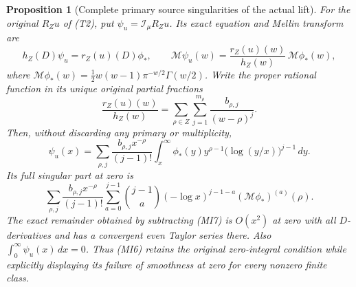 \documentclass[11pt]{article}
\newtheorem{proposition}[theorem]{Proposition}
\begin{document}
\begin{proposition}[Complete primary source singularities of the actual lift]
For the original $R_Zu$ of (T2), put
$\psi_u=\mathcal I_\mu R_Zu$. Its exact equation and Mellin transform
are
\[
 h_Z(D)\psi_u=r_Z(u)(D)\phi_*,\qquad
 \mathcal M\psi_u(w)=
       \frac{r_Z(u)(w)}{h_Z(w)}\,\mathcal M\phi_*(w),
 \tag{MI5}
\]
where
$\mathcal M\phi_*(w)=\frac12w(w-1)\pi^{-w/2}\Gamma(w/2)$.
Write the proper rational function in its unique original partial
fractions
\[
 \frac{r_Z(u)(w)}{h_Z(w)}
 =\sum_{\rho\in Z}\sum_{j=1}^{m_\rho}
                     \frac{b_{\rho,j}}{(w-\rho)^j}.
\]
Then, without discarding any primary or multiplicity,
\[
 \psi_u(x)=\sum_{\rho,j}\frac{b_{\rho,j}x^{-\rho}}{(j-1)!}
  \int_x^\infty \phi_*(y)y^{\rho-1}
                    \bigl(\log(y/x)\bigr)^{j-1}\,dy.
 \tag{MI6}
\]
Its full singular part at zero is
\[
 \sum_{\rho,j}\frac{b_{\rho,j}x^{-\rho}}{(j-1)!}
 \sum_{a=0}^{j-1}\binom{j-1}{a}
        (-\log x)^{j-1-a}(\mathcal M\phi_*)^{(a)}(\rho).
 \tag{MI7}
\]
The exact remainder obtained by subtracting (MI7) is $O(x^2)$ at
zero with all $D$-derivatives and has a convergent even Taylor series
there. Also $\int_0^\infty\psi_u(x)\,dx=0$. Thus (MI6) retains
the original zero-integral condition while explicitly displaying its
failure of smoothness at zero for every nonzero finite class.
\end{proposition}
\end{document}
